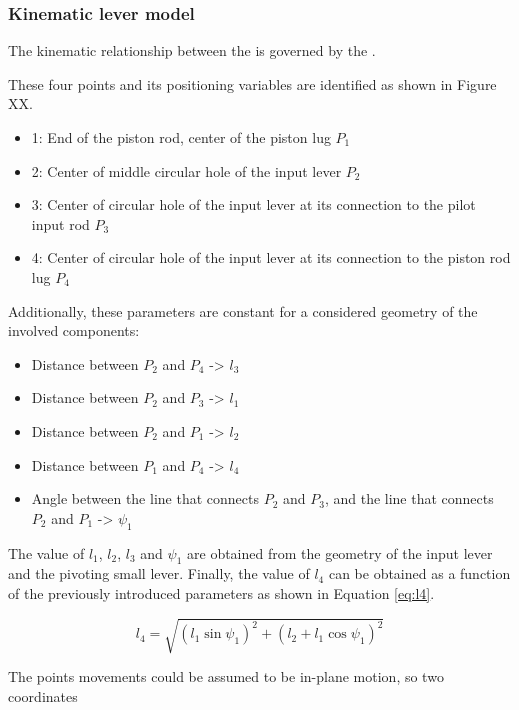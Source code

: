   \subsubsection{Kinematic lever model}

    The kinematic relationship between the is governed by the . 

    These four points and its positioning variables are identified as shown in Figure XX.

    \begin{itemize}
      \item 1: End of the piston rod, center of the piston lug $P_1$
      \item 2: Center of middle circular hole of the input lever $P_2$
      \item 3: Center of circular hole of the input lever at its connection to the pilot input rod $P_3$
      \item 4: Center of circular hole of the input lever at its connection to the piston rod lug $P_4$
    \end{itemize}

    Additionally, these parameters are constant for a considered geometry of the involved components:

    \begin{itemize}
      \item Distance between $P_2$ and $P_4$ -> $l_3$
      \item Distance between $P_2$ and $P_3$ -> $l_1$
      \item Distance between $P_2$ and $P_1$ -> $l_2$
      \item Distance between $P_1$ and $P_4$ -> $l_4$
      \item Angle between the line that connects $P_2$ and $P_3$, and the line that connects $P_2$ and $P_1$ -> $\psi_1$
    \end{itemize}

    The value of $l_1$, $l_2$, $l_3$ and $\psi_1$ are obtained from the geometry of the input lever and the pivoting small lever. Finally, the value of $l_4$ can be obtained as a function of the previously introduced parameters as shown in Equation \ref{eq:l4}.

    \begin{equation}\label{eq:l4}
      l_4 = \sqrt{ (l_1 \sin\psi_1)^2 + (l_2 + l_1 \cos\psi_1)^2 }
    \end{equation}


    The points movements could be assumed to be in-plane motion, so two coordinates 